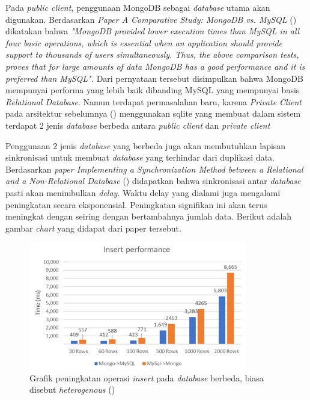 Pada \emph{public client}, penggunaan MongoDB sebagai \emph{database} utama akan digunakan. Berdasarkan
\emph{Paper A Comparative Study: MongoDB vs. MySQL} (\cite{Comparative2015}) dikatakan bahwa \emph{"MongoDB provided lower 
execution times than MySQL in all four basic operations, which is essential when an application 
should provide support to thousands of users simultaneously. Thus, the above comparison tests, 
proves that for large amounts of data MongoDB has a good performance and it is preferred than MySQL".}
Dari pernyataan tersebut disimpulkan bahwa MongoDB mempunyai performa yang lebih baik dibanding MySQL
yang mempunyai basis \emph{Relational Database}. Namun terdapat permasalahan baru, karena \emph{Private Client}
pada arsitektur sebelumnya (\cite{ridho2024}) menggunakan sqlite yang membuat dalam sistem terdapat 2 jenis \emph{database}
berbeda antara \emph{public client} dan \emph{private client}

Penggunaan 2 jenis \emph{database} yang berbeda juga akan membutuhkan lapisan sinkronisasi
untuk membuat \emph{database} yang terhindar dari duplikasi data. Berdasarkan \emph{paper Implementing a 
Synchronization Method between a Relational and a Non-Relational Database} (\cite{Gyrdi2023}) didapatkan bahwa 
sinkronisasi antar \emph{database} pasti akan menimbulkan \emph{delay}. Waktu delay yang dialami juga mengalami
peningkatan secara eksponensial. Peningkatan signifikan ini akan terus meningkat dengan seiring dengan 
bertambahnya jumlah data. Berikut adalah gambar \emph{chart} yang didapat dari paper tersebut.

\begin{figure}[H]
  \centering{}
	\includegraphics[width=0.85\textwidth]{gambar/bab1/chart-exponent}
  \caption{Grafik peningkatan operasi \emph{insert} pada \emph{database} berbeda, biasa disebut \emph{heterogenous} (\cite{Gyrdi2023})} 
\end{figure}

